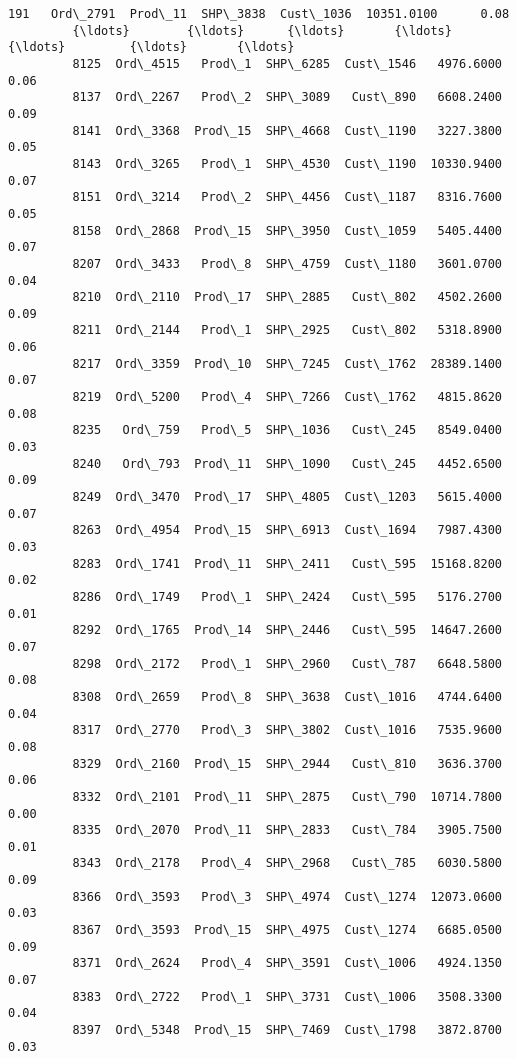 \documentclass[11pt]{article}
\begin{document}
\begin{Verbatim}[commandchars=\\\{\}]
         191   Ord\_2791  Prod\_11  SHP\_3838  Cust\_1036  10351.0100      0.08   
         {\ldots}        {\ldots}      {\ldots}       {\ldots}        {\ldots}         {\ldots}       {\ldots}   
         8125  Ord\_4515   Prod\_1  SHP\_6285  Cust\_1546   4976.6000      0.06   
         8137  Ord\_2267   Prod\_2  SHP\_3089   Cust\_890   6608.2400      0.09   
         8141  Ord\_3368  Prod\_15  SHP\_4668  Cust\_1190   3227.3800      0.05   
         8143  Ord\_3265   Prod\_1  SHP\_4530  Cust\_1190  10330.9400      0.07   
         8151  Ord\_3214   Prod\_2  SHP\_4456  Cust\_1187   8316.7600      0.05   
         8158  Ord\_2868  Prod\_15  SHP\_3950  Cust\_1059   5405.4400      0.07   
         8207  Ord\_3433   Prod\_8  SHP\_4759  Cust\_1180   3601.0700      0.04   
         8210  Ord\_2110  Prod\_17  SHP\_2885   Cust\_802   4502.2600      0.09   
         8211  Ord\_2144   Prod\_1  SHP\_2925   Cust\_802   5318.8900      0.06   
         8217  Ord\_3359  Prod\_10  SHP\_7245  Cust\_1762  28389.1400      0.07   
         8219  Ord\_5200   Prod\_4  SHP\_7266  Cust\_1762   4815.8620      0.08   
         8235   Ord\_759   Prod\_5  SHP\_1036   Cust\_245   8549.0400      0.03   
         8240   Ord\_793  Prod\_11  SHP\_1090   Cust\_245   4452.6500      0.09   
         8249  Ord\_3470  Prod\_17  SHP\_4805  Cust\_1203   5615.4000      0.07   
         8263  Ord\_4954  Prod\_15  SHP\_6913  Cust\_1694   7987.4300      0.03   
         8283  Ord\_1741  Prod\_11  SHP\_2411   Cust\_595  15168.8200      0.02   
         8286  Ord\_1749   Prod\_1  SHP\_2424   Cust\_595   5176.2700      0.01   
         8292  Ord\_1765  Prod\_14  SHP\_2446   Cust\_595  14647.2600      0.07   
         8298  Ord\_2172   Prod\_1  SHP\_2960   Cust\_787   6648.5800      0.08   
         8308  Ord\_2659   Prod\_8  SHP\_3638  Cust\_1016   4744.6400      0.04   
         8317  Ord\_2770   Prod\_3  SHP\_3802  Cust\_1016   7535.9600      0.08   
         8329  Ord\_2160  Prod\_15  SHP\_2944   Cust\_810   3636.3700      0.06   
         8332  Ord\_2101  Prod\_11  SHP\_2875   Cust\_790  10714.7800      0.00   
         8335  Ord\_2070  Prod\_11  SHP\_2833   Cust\_784   3905.7500      0.01   
         8343  Ord\_2178   Prod\_4  SHP\_2968   Cust\_785   6030.5800      0.09   
         8366  Ord\_3593   Prod\_3  SHP\_4974  Cust\_1274  12073.0600      0.03   
         8367  Ord\_3593  Prod\_15  SHP\_4975  Cust\_1274   6685.0500      0.09   
         8371  Ord\_2624   Prod\_4  SHP\_3591  Cust\_1006   4924.1350      0.07   
         8383  Ord\_2722   Prod\_1  SHP\_3731  Cust\_1006   3508.3300      0.04   
         8397  Ord\_5348  Prod\_15  SHP\_7469  Cust\_1798   3872.8700      0.03   
         

\end{Verbatim}
\end{document}
